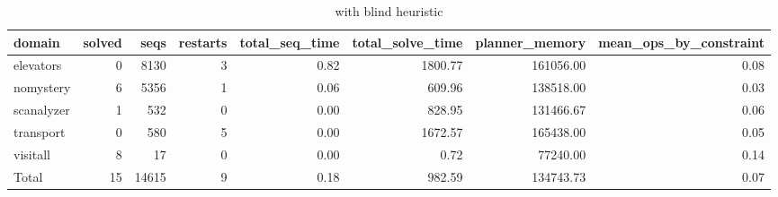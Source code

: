 \begin{table*}[htbp]
\centering
\begingroup\small
\begin{tabular}{lrrrrrrr}
  \hline
domain & solved & seqs & restarts & total\_seq\_time & total\_solve\_time & planner\_memory & mean\_ops\_by\_constraint \\ 
  \hline
elevators &   0 & 8130 &   3 & 0.82 & 1800.77 & 161056.00 & 0.08 \\ 
  nomystery &   6 & 5356 &   1 & 0.06 & 609.96 & 138518.00 & 0.03 \\ 
  scanalyzer &   1 & 532 &   0 & 0.00 & 828.95 & 131466.67 & 0.06 \\ 
  transport &   0 & 580 &   5 & 0.00 & 1672.57 & 165438.00 & 0.05 \\ 
  visitall &   8 &  17 &   0 & 0.00 & 0.72 & 77240.00 & 0.14 \\ 
  Total &  15 & 14615 &   9 & 0.18 & 982.59 & 134743.73 & 0.07 \\ 
   \hline
\end{tabular}
\endgroup
\caption{\oursolver{} with blind heuristic} 
\label{tab:selected_blind}
\end{table*}
